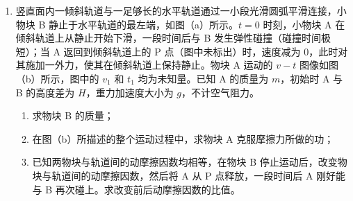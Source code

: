 \documentclass[\gkver]{gaokaozhenti}
\begin{document}
\begin{enumerate}


\item
竖直面内一倾斜轨道与一足够长的水平轨道通过一小段光滑圆弧平滑连接，小物块 B 静止于水平轨道的最左端，如图（a）所示。$t=0$ 时刻，小物块 A 在倾斜轨道上从静止开始下滑，一段时间后与 B 发生弹性碰撞（碰撞时间极短）；当 A 返回到倾斜轨道上的 P 点（图中未标出）时，速度减为 0，此时对其施加一外力，使其在倾斜轨道上保持静止。物块 A 运动的 $v-t$ 图像如图（b）所示，图中的 $v_1$ 和 $t_1$ 均为未知量。已知 A 的质量为 $m$，初始时 A 与 B 的高度差为 $H$，重力加速度大小为 $g$，不计空气阻力。
\begin{enumerate}
	\item
	求物块 B 的质量；
	\item
	在图（b）所描述的整个运动过程中，求物块 A 克服摩擦力所做的功；
	\item
	已知两物块与轨道间的动摩擦因数均相等，在物块 B 停止运动后，改变物块与轨道间的动摩擦因数，然后将 A 从 P 点释放，一段时间后 A 刚好能与 B 再次碰上。求改变前后动摩擦因数的比值。
\end{enumerate}



\end{enumerate}
\end{document}
